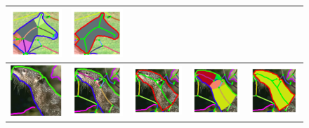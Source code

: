 \begin{figure}[pht]
\begin{tabular}{|c|c|c|c|c|}
\includegraphics[width=0.16\linewidth]{figs/113044_00_rc_before_frags.pdf} &
\includegraphics[width=0.16\linewidth]{figs/113044_00_rc_after_frags.pdf}\\
\hline
\includegraphics[width=0.16\linewidth]{figs/173036_00_rc_cons.pdf} &
\includegraphics[width=0.16\linewidth]{figs/173036_00_rc_before_shocks.pdf} &
\includegraphics[width=0.16\linewidth]{figs/173036_00_rc_after_shocks.pdf} &
\includegraphics[width=0.16\linewidth]{figs/173036_00_rc_before_frags.pdf} &
\includegraphics[width=0.16\linewidth]{figs/173036_00_rc_after_frags.pdf}\\

\end{tabular}
\end{figure}
